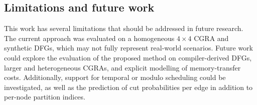 \subsection{Limitations and future work}

This work has several limitations that should be addressed in future research. The current approach was evaluated on a homogeneous $4\times4$ CGRA and synthetic DFGs, which may not fully represent real-world scenarios. Future work could explore the evaluation of the proposed method on compiler-derived DFGs, larger and heterogeneous CGRAs, and explicit modelling of memory-transfer costs. Additionally, support for temporal or modulo scheduling could be investigated, as well as the prediction of cut probabilities per edge in addition to per-node partition indices.


